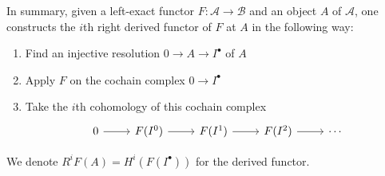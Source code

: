 In summary, given a left-exact functor $F:\mathcal{A}\to
\mathcal{B}$ and an object $A$ of $\mathcal{A}$, one constructs the $i$th
right derived functor of $F$ at $A$ in the following way:
\begin{enumerate}
  \item Find an injective resolution $0\to A\to I^{\bullet}$ of $A$
  \item Apply $F$ on the cochain complex $0\to I^{\bullet}$
  \item Take the $i$th cohomology of this cochain complex
        \[\begin{tikzcd}
            0\rar & F(I^{0})\rar & F(I^{1})\rar
            & F(I^{2})\rar & \cdots
          \end{tikzcd}\]
\end{enumerate}
We denote $R^{i}F(A)=H^{i}(F(I^{\bullet}))$ for the
derived functor.
